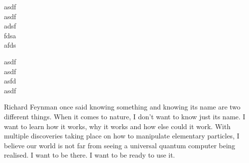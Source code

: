 \documentclass[a4paper,10pt]{article}
\begin{document}
asdf\\
asdf\\
adsf\\
fdsa\\
afds

asdf\\
asdf\\
asfd\\
asdf



Richard Feynman once said knowing something and knowing its name are two different things.
When it comes to nature, I don't want to know just its name. I want to learn how it works, why it works and how else could it work.
With multiple discoveries taking place on how to manipulate elementary particles, I believe our world is not far from seeing a universal quantum computer being realised.
I want to be there. I want to be ready to use it.
\end{document}
